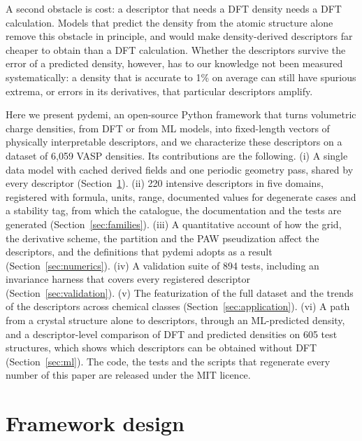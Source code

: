 \documentclass[11pt,a4paper]{article}
\begin{document}
A second obstacle is cost: a descriptor that needs a DFT density needs a DFT
calculation. Models that predict the density from the atomic structure
alone~\cite{chandrasekaran2019,jorgensen2022,koker2024} remove this
obstacle in principle, and would make density-derived descriptors far
cheaper to obtain than a DFT calculation. Whether the descriptors survive the
error of a predicted density, however, has to our knowledge not been measured
systematically: a density that is
accurate to 1\% on average can still have spurious extrema, or errors in its
derivatives, that particular descriptors amplify.

Here we present pydemi, an open-source Python framework that turns volumetric
charge densities, from DFT or from ML models, into fixed-length vectors of
physically interpretable descriptors, and we characterize these descriptors
on a dataset of 6,059 VASP densities. Its contributions are the following.
(i) A single data model with cached derived fields and one periodic geometry
pass, shared by every descriptor (Section~\ref{sec:framework}). (ii) 220
intensive descriptors in five domains, registered with formula, units, range,
documented values for degenerate cases and a stability tag, from which the
catalogue, the documentation and the tests are generated
(Section~\ref{sec:families}). (iii) A quantitative account of how the grid,
the derivative scheme, the partition and the PAW pseudization affect the
descriptors, and the definitions that pydemi adopts as a result
(Section~\ref{sec:numerics}). (iv) A validation suite of 894 tests, including
an invariance harness that covers every registered descriptor
(Section~\ref{sec:validation}). (v) The featurization of the full dataset and
the trends of the descriptors across chemical classes
(Section~\ref{sec:application}). (vi) A path from a crystal structure alone to
descriptors, through an ML-predicted density, and a descriptor-level
comparison of DFT and predicted densities on 605 test structures, which shows
which descriptors can be obtained without DFT (Section~\ref{sec:ml}). The code, the tests and
the scripts that regenerate every number of this paper are released under the
MIT licence.

\section{Framework design}
\label{sec:framework}
\end{document}
